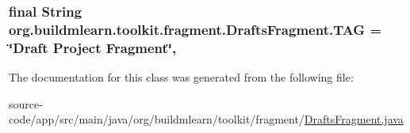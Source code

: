 \subsubsection[{\texorpdfstring{T\+AG}{TAG}}]{\setlength{\rightskip}{0pt plus 5cm}final String org.\+buildmlearn.\+toolkit.\+fragment.\+Drafts\+Fragment.\+T\+AG = \char`\"{}Draft Project Fragment\char`\"{}\hspace{0.3cm}{\ttfamily [static]}, {\ttfamily [private]}}\hypertarget{classorg_1_1buildmlearn_1_1toolkit_1_1fragment_1_1DraftsFragment_a70a4f3509b545bd45556bf041b0950e1}{}\label{classorg_1_1buildmlearn_1_1toolkit_1_1fragment_1_1DraftsFragment_a70a4f3509b545bd45556bf041b0950e1}


The documentation for this class was generated from the following file\+:\begin{DoxyCompactItemize}
\item 
source-\/code/app/src/main/java/org/buildmlearn/toolkit/fragment/\hyperlink{DraftsFragment_8java}{Drafts\+Fragment.\+java}\end{DoxyCompactItemize}
